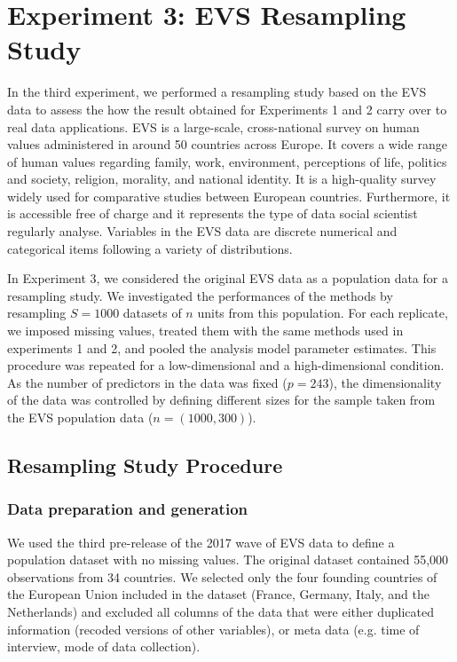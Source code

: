 \section{Experiment 3: EVS Resampling Study}

In the third experiment, we performed a resampling study based on the EVS data to assess the 
how the result obtained for Experiments 1 and 2 carry over to real data applications.
EVS is a large-scale, cross-national survey on human values administered in around 50 countries
across Europe.
It covers a wide range of human values regarding family, work, environment, perceptions of 
life, politics and society, religion, morality, and national identity.
It is a high-quality survey widely used for comparative studies between European countries.
Furthermore, it is accessible free of charge and it represents the type of data social scientist 
regularly analyse.
Variables in the EVS data are discrete numerical and categorical items following a 
variety of distributions.

In Experiment 3, we considered the original EVS data as a population data for a resampling study.
We investigated the performances of the methods by resampling $S=1000$ datasets of $n$ units from this 
population.
For each replicate, we imposed missing values, treated them with the same methods used in 
experiments 1 and 2, and pooled the analysis model parameter estimates.
This procedure was repeated for a low-dimensional and a high-dimensional condition. 
As the number of predictors in the data was fixed ($p = 243$), the dimensionality of the data was 
controlled by defining different sizes for the sample taken from the EVS population data 
($n = (1000, 300)$).

\subsection{Resampling Study Procedure} \label{resProc}

\subsubsection{Data preparation and generation}
	We used the third pre-release of the 2017 wave of EVS data \citep{EVS:2017} to define a population dataset 
	with no missing values.
	The original dataset contained 55,000 observations from 34 countries.
	We selected only the four founding countries of the European Union included in the dataset (France, Germany,
	Italy, and the Netherlands) and excluded all columns of the data that were either duplicated
	information (recoded versions of other variables), or meta data (e.g. time of interview,
	mode of data collection).

